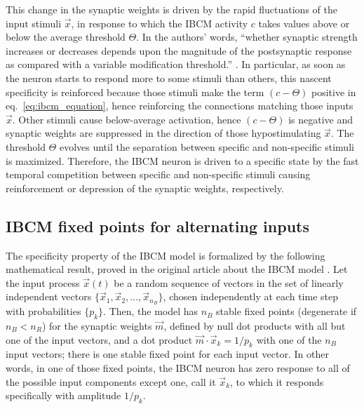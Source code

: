 This change in the synaptic weights is driven by the rapid fluctuations of the input stimuli $\vec{x}$, in response to which the IBCM activity $c$ takes values above or below the average threshold $\Theta$. In the authors' words, ``whether synaptic strength increases or decreases depends upon the magnitude of the postsynaptic response as compared with a variable modification threshold.'' \cite{bienenstock_theory_1982}. In particular, as soon as the neuron starts to respond more to some stimuli than others, this nascent specificity is reinforced because those stimuli make the term $(c - \Theta)$ positive in eq.~\eqref{eq:ibcm_equation}, hence reinforcing the connections matching those inputs $\vec{x}$. Other stimuli cause below-average activation, hence $(c - \Theta)$ is negative and synaptic weights are suppressed in the direction of those hypostimulating $\vec{x}$. The threshold $\Theta$ evolves until the separation between specific and non-specific stimuli is maximized. Therefore, the IBCM neuron is driven to a specific state by the fast temporal competition between specific and non-specific stimuli causing reinforcement or depression of the synaptic weights, respectively. 


\subsection{IBCM fixed points for alternating inputs}
\label{subsect:ibcm_alternating}
The specificity property of the IBCM model is formalized by the following mathematical result, proved in the original article about the IBCM model \cite{intrator_objective_1992}. Let the input process $\vec{x}(t)$ be a random sequence of vectors in the set of linearly independent vectors $\{ \vec{x}_1, \vec{x}_2, \ldots, \vec{x}_{n_B} \}$, chosen independently at each time step with probabilities $\{p_k\}$. Then, the model has $n_B$ stable fixed points (degenerate if $n_B < n_R$)  for the synaptic weights $\vec{m}$, defined by null dot products with all but one of the input vectors, and a dot product $\vec{m} \cdot \vec{x}_k = 1/p_k$ with one of the $n_B$ input vectors; there is one stable fixed point for each input vector. In other words, in one of those fixed points, the IBCM neuron has zero response to all of the possible input components except one, call it $\vec{x}_k$, to which it responds specifically with amplitude $1/p_k$. 



